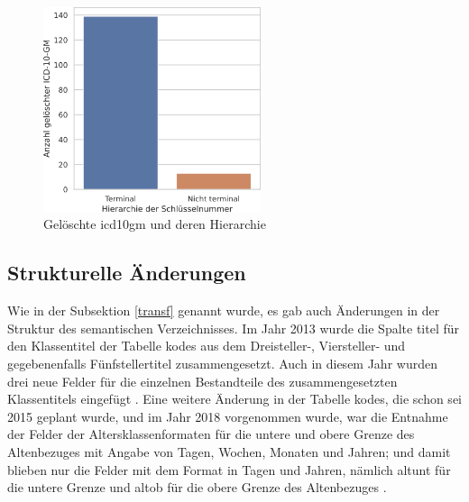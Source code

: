 \begin{figure}[ht]
	\centering
	\includegraphics[height=6cm]{figures/ortoldYear}
	\caption{Gelöschte \acs{icd10gm} und deren Hierarchie}
	\label{fig:oldicdort}
\end{figure}

\subsection{Strukturelle Änderungen}

Wie in der Subsektion \ref{transf} genannt wurde, es gab auch Änderungen in der Struktur des semantischen Verzeichnisses. Im Jahr 2013 wurde die Spalte \textsf{titel} für den Klassentitel der Tabelle \textsf{kodes} aus dem Dreisteller-, Viersteller- und gegebenenfalls Fünfstellertitel zusammengesetzt. Auch in diesem Jahr wurden drei neue Felder für die einzelnen Bestandteile des zusammengesetzten Klassentitels eingefügt \cite{readme13}. Eine weitere Änderung in der Tabelle \textsf{kodes}, die schon sei 2015 geplant wurde, und im Jahr 2018 vorgenommen wurde, war die Entnahme der Felder der Altersklassenformaten für die untere und obere Grenze des Altenbezuges mit Angabe von Tagen, Wochen, Monaten und Jahren; und damit blieben nur die Felder mit dem Format in Tagen und Jahren, nämlich  \textsf{altunt} für die untere Grenze und \textsf{altob} für die obere Grenze des Altenbezuges \cite{readme17}.
